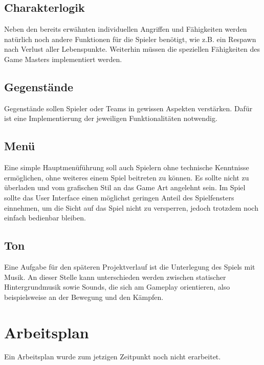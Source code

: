 \documentclass[10pt,a4paper,notitlepage]{report}
\begin{document}
\begin{flushleft}
\subsection{Charakterlogik} 
Neben den bereits erwähnten individuellen Angriffen und Fähigkeiten werden natürlich noch andere Funktionen für die Spieler benötigt, wie z.B. ein Respawn nach Verlust aller Lebenspunkte. Weiterhin müssen die speziellen Fähigkeiten des Game Masters implementiert werden.

\subsection{Gegenstände}
Gegenstände sollen Spieler oder Teams in gewissen Aspekten verstärken. Dafür ist eine Implementierung der jeweiligen Funktionalitäten notwendig.

\subsection{Menü}
Eine simple Hauptmenüführung soll auch Spielern ohne technische Kenntnisse ermöglichen, ohne weiteres einem Spiel beitreten zu können. Es sollte nicht zu überladen und vom grafischen Stil an das Game Art angelehnt sein. Im Spiel sollte das User Interface einen möglichst geringen Anteil des Spielfensters einnehmen, um die Sicht auf das Spiel nicht zu versperren, jedoch trotzdem noch einfach bedienbar bleiben. 

\subsection{Ton} 
Eine Aufgabe für den späteren Projektverlauf ist die Unterlegung des Spiels mit Musik. An dieser Stelle kann unterschieden werden zwischen statischer Hintergrundmusik sowie Sounds, die sich am Gameplay orientieren, also beispielsweise an der Bewegung und den Kämpfen.

\section{Arbeitsplan}
Ein Arbeitsplan wurde zum jetzigen Zeitpunkt noch nicht erarbeitet.


\end{flushleft}
\end{document}
